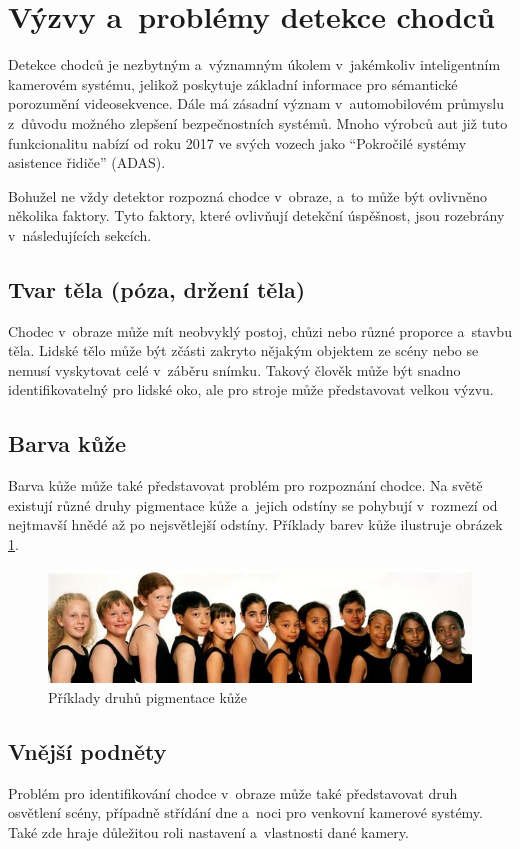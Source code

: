 \section{Výzvy a~problémy detekce chodců}
Detekce chodců je nezbytným a~významným úkolem v~jakémkoliv inteligentním kamerovém systému, jelikož poskytuje základní informace pro sémantické porozumění videosekvence. Dále má zásadní význam v~automobilovém průmyslu z~důvodu možného zlepšení bezpečnostních systémů. Mnoho výrobců aut již tuto funkcionalitu nabízí od roku 2017 ve svých vozech jako ``Pokročilé systémy asistence řidiče'' (ADAS)\cite{adas}.

Bohužel ne vždy detektor rozpozná chodce v~obraze, a~to může být ovlivněno několika faktory. Tyto faktory, které ovlivňují detekční úspěšnost, jsou rozebrány v~následujících sekcích.

\subsection{Tvar těla (póza, držení těla)}
Chodec v~obraze může mít neobvyklý postoj, chůzi nebo různé proporce a~stavbu těla. Lidské tělo může být zčásti zakryto nějakým objektem ze scény nebo se nemusí vyskytovat celé v~záběru snímku. Takový člověk může být snadno identifikovatelný pro lidské oko, ale pro stroje může představovat velkou výzvu. 

\subsection{Barva kůže}
Barva kůže může také představovat problém pro rozpoznání chodce. Na světě existují různé druhy pigmentace kůže a~jejich odstíny se pohybují v~rozmezí od nejtmavší hnědé až po nejsvětlejší odstíny. Příklady barev kůže ilustruje obrázek \ref{colorskin}.

\begin{figure}[H]
\centering
\includegraphics[width=15cm]{figures/colorskin}
\caption{Příklady druhů pigmentace kůže\cite{skincolor:obr}}
\label{colorskin}
\end{figure}

\subsection{Vnější podněty}
Problém pro identifikování chodce v~obraze může také představovat druh osvětlení scény, případně střídání dne a~noci pro venkovní kamerové systémy. Také zde hraje důležitou roli nastavení a~vlastnosti dané kamery. 

